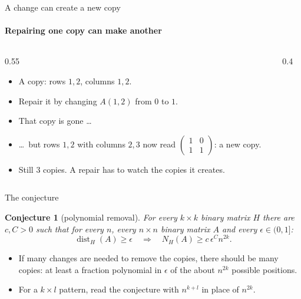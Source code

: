 \documentclass[aspectratio=169,11pt,t]{beamer}
\DeclareMathOperator{\dist}{dist}
\newtheorem{conjecture}[theorem]{Conjecture}
\newcommand{\smallmat}[1]{\left(\begin{smallmatrix}#1\end{smallmatrix}\right)}
\begin{document}
\begin{frame}{A change can create a new copy}
\framesubtitle{Repairing one copy can make another}
\begin{columns}[T]
\begin{column}{0.55\textwidth}
\begin{itemize}
\item<1-> A copy: rows $1,2$, columns $1,2$.
\item<2-> Repair it by changing $A(1,2)$ from $0$ to $1$.
\item<3-> That copy is gone \dots
\item<4-> \dots\ but rows $1,2$ with columns $2,3$ now read $\smallmat{1&0\\1&1}$: a \alert{new copy}.
\item<5-> Still $3$ copies. A repair has to watch the copies it creates.
\end{itemize}
\end{column}
\begin{column}{0.4\textwidth}
\centering
\end{column}
\end{columns}
\end{frame}

\begin{frame}{The conjecture}
\begin{conjecture}[polynomial removal]
For every $k\times k$ binary matrix $H$ there are $c,C>0$ such that for every $n$, every
$n\times n$ binary matrix $A$ and every $\epsilon\in(0,1]$:
\[ \dist_H(A)\ge\epsilon \quad\Longrightarrow\quad N_H(A)\ge c\,\epsilon^{C}n^{2k}. \]
\end{conjecture}
\medskip
\begin{itemize}
\item If many changes are needed to remove the copies, there should be many copies: at least a
fraction polynomial in $\epsilon$ of the about $n^{2k}$ possible positions.
\item For a $k\times l$ pattern, read the conjecture with $n^{k+l}$ in place of $n^{2k}$.
\end{itemize}
\end{frame}
\end{document}
